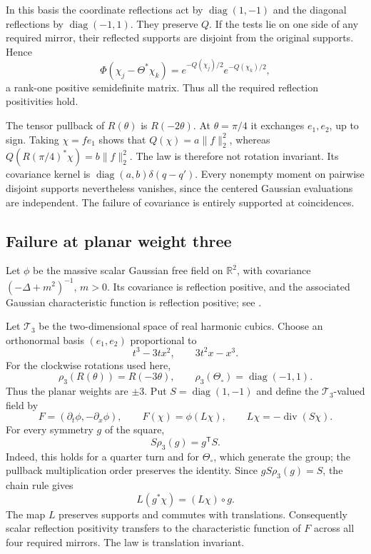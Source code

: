 \documentclass[11pt, letterpaper, reqno]{amsart}
\theoremstyle{definition}
\theoremstyle{remark}
\newcommand{\bbR}{\mathbb{R}}
\newcommand{\calT}{\mathcal{T}}
\begin{document}
In this basis the coordinate reflections act by
$\operatorname{diag}(1,-1)$ and the diagonal reflections by
$\operatorname{diag}(-1,1)$. They preserve $Q$. If the tests lie on
one side of any required mirror, their reflected supports are disjoint
from the original supports. Hence
\[
 \Phi(\chi_j-\Theta^*\chi_k)
 =e^{-Q(\chi_j)/2}e^{-Q(\chi_k)/2},
\]
a rank-one positive semidefinite matrix. Thus all the required
reflection positivities hold.

The tensor pullback of $R(\theta)$ is $R(-2\theta)$. At
$\theta=\pi/4$ it exchanges $e_1,e_2$, up to sign. Taking
$\chi=f e_1$ shows that $Q(\chi)=a\|f\|_2^2$, whereas
$Q(R(\pi/4)^*\chi)=b\|f\|_2^2$. The law is therefore not rotation
invariant. Its covariance kernel is
$\operatorname{diag}(a,b)\delta(q-q')$.
Every nonempty moment on pairwise disjoint supports nevertheless
vanishes, since the centered Gaussian evaluations are independent.
The failure of covariance is entirely supported at coincidences.

\subsection{Failure at planar weight three}

Let $\phi$ be the massive scalar Gaussian free field on $\bbR^2$,
with covariance $(-\Delta+m^2)^{-1}$, $m>0$. Its covariance is
reflection positive, and the associated Gaussian characteristic
function is reflection positive; see \cite[pp.~119--120]{Uhl79}.

Let $\calT_3$ be the two-dimensional space of real harmonic cubics.
Choose an orthonormal basis $(e_1,e_2)$ proportional to
\[
 t^3-3tx^2,\qquad 3t^2x-x^3.
\]
For the clockwise rotations used here,
\[
 \rho_3(R(\theta))=R(-3\theta),\qquad
 \rho_3(\Theta_\circ)=\operatorname{diag}(-1,1).
\]
Thus the planar weights are $\pm3$. Put $S=\operatorname{diag}(1,-1)$
and define the $\calT_3$-valued field by
\[
 F=(\partial_t\phi,-\partial_x\phi),\qquad
 F(\chi)=\phi(L\chi),\qquad L\chi=-\operatorname{div}(S\chi).
\]
For every symmetry $g$ of the square,
\[
 S\rho_3(g)=g^{\mathsf T}S.
\]
Indeed, this holds for a quarter turn and for $\Theta_\circ$, which
generate the group; the pullback multiplication order preserves the
identity. Since $gS\rho_3(g)=S$, the chain rule gives
\[
 L(g^*\chi)=(L\chi)\circ g.
\]
The map $L$ preserves supports and commutes with translations.
Consequently scalar reflection positivity transfers to the
characteristic function of $F$ across all four required mirrors.
The law is translation invariant.
\end{document}
